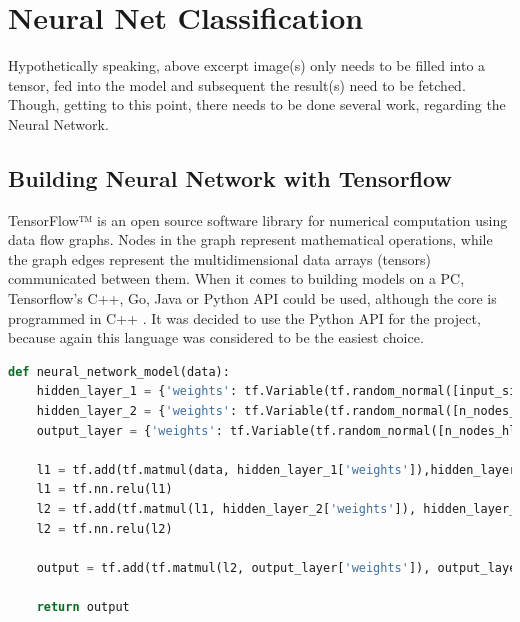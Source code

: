 \section{Neural Net Classification}
Hypothetically speaking, above excerpt image(s) only needs to be filled into a tensor, fed into the model and subsequent the result(s) need to be fetched. Though, getting to this point, there needs to be done several work, regarding the Neural Network.  

\subsection{Building Neural Network with Tensorflow}
TensorFlow™ is an open source software library for numerical computation using data flow graphs. Nodes in the graph represent mathematical operations, while the graph edges represent the multidimensional data arrays (tensors) communicated between them. \cite{tensorflow} When it comes to building models on a PC, Tensorflow's C++, Go, Java or Python API could be used, although the core is programmed in C++ \cite{tensorflowcore}. It was decided to use the Python API for the project, because again this language was considered to be the easiest choice. \newline

\begin{minipage}{\linewidth}
\begin{lstlisting}[language=python]
def neural_network_model(data):
	hidden_layer_1 = {'weights': tf.Variable(tf.random_normal([input_size, n_nodes_hl1])), 'biases': tf.Variable(tf.random_normal([n_nodes_hl1]))}
	hidden_layer_2 = {'weights': tf.Variable(tf.random_normal([n_nodes_hl1, n_nodes_hl2])), 'biases': tf.Variable(tf.random_normal([n_nodes_hl2]))}
	output_layer = {'weights': tf.Variable(tf.random_normal([n_nodes_hl2, n_classes])), 'biases': tf.Variable(tf.random_normal([n_classes]))}
	
	l1 = tf.add(tf.matmul(data, hidden_layer_1['weights']),hidden_layer_1['biases'])
	l1 = tf.nn.relu(l1)
	l2 = tf.add(tf.matmul(l1, hidden_layer_2['weights']), hidden_layer_2['biases'])
	l2 = tf.nn.relu(l2)
	
	output = tf.add(tf.matmul(l2, output_layer['weights']), output_layer['biases'])
	
	return output
\end{lstlisting}
\end{minipage}

